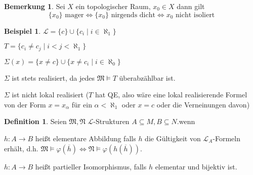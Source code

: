 \documentclass[12pt,parskip=full]{scrartcl}
\theoremstyle{definition}
\newtheorem{definition}[theorem]{Definition}
\newtheorem{example}[theorem]{Beispiel}
\newtheorem{remark}[theorem]{Bemerkung}
\begin{document}
	\begin{remark}
		Sei $X$ ein topologischer Raum, $x_0 \in X$ dann gilt
		\begin{equation*}
			\{ x_0 \} \text{ mager} \Leftrightarrow \{ x_0 \} \text{ nirgends dicht} \Leftrightarrow \text{$x_0$ nicht isoliert}
		\end{equation*}
	\end{remark}

	\begin{example}
		$\mathcal{L} = \{ c \} \cup \{ c_i \mid i \in \aleph_1 \}$
		
		$T = \{ c_i \neq c_j \mid i < j < \aleph_1 \}$
		
		$\Sigma(x) = \{ x \neq c \} \cup \{ x \neq c_i \mid i \in \aleph_0 \}$
		
		$\Sigma$ ist stets realisiert, da jedes $\mathfrak{M} \models T$ überabzählbar ist.
		
		$\Sigma$ ist nicht lokal realisiert ($T$ hat QE, also wäre eine lokal realisierende Formel von der Form $x = x_\alpha$ für ein $\alpha < \aleph_1$ oder $x = c$ oder die Verneinungen davon)
	\end{example}

	\begin{definition}
		Seien $\mathfrak{M}, \mathfrak{N}$ $\mathcal{L}$-Strukturen $A \subseteq M, B \subseteq N$.wenn
		
		$h: A \to B$ heißt elementare Abbildung falls $h$ die Gültigkeit von $\mathcal{L}_A$-Formeln erhält, d.h. $\mathfrak{M} \models \varphi(\overline{h}) \Leftrightarrow \mathfrak{N} \models \varphi(h(\overline{h}))$.
		
		$h: A \to B$ heißt partieller Isomorphismus, falls $h$ elementar und bijektiv ist.
	\end{definition}
\end{document}
